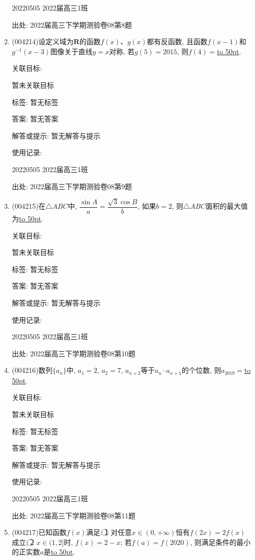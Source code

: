 \documentclass[10pt,a4paper]{article}
\newcommand{\blank}[1]{\underline{\hbox to #1pt{}}}
\begin{document}
\begin{enumerate}[1.]
20220505	2022届高三1班	


出处: 2022届高三下学期测验卷08第8题
\item { (004214)}设定义域为$\mathbf{R}$的函数$f(x)$、$g(x)$都有反函数, 且函数$f(x-1)$和$g^{-1}(x-3)$图像关于直线$y=x$对称, 若$g(5)=2015$, 则$f(4)=$\blank{50}.


关联目标:

暂未关联目标



标签: 暂无标签

答案: 暂无答案

解答或提示: 暂无解答与提示

使用记录:

20220505	2022届高三1班	


出处: 2022届高三下学期测验卷08第9题
\item { (004215)}在$\triangle ABC$中, $\dfrac{\sin A}a=\dfrac{\sqrt 3\cos B}b$, 如果$b=2$, 则$\triangle ABC$面积的最大值为\blank{50}.


关联目标:

暂未关联目标



标签: 暂无标签

答案: 暂无答案

解答或提示: 暂无解答与提示

使用记录:

20220505	2022届高三1班	


出处: 2022届高三下学期测验卷08第10题
\item { (004216)}数列$\{a_n\}$中, $a_1=2$, $a_2=7$, $a_{n+2}$等于$a_n\cdot a_{n+1}$的个位数, 则$a_{2019}=$\blank{50}.


关联目标:

暂未关联目标



标签: 暂无标签

答案: 暂无答案

解答或提示: 暂无解答与提示

使用记录:

20220505	2022届高三1班	


出处: 2022届高三下学期测验卷08第11题
\item { (004217)}已知函数$f(x)$满足: \textcircled{1} 对任意$x\in (0,+\infty)$恒有$f(2x)=2f(x)$成立; \textcircled{2} $x\in (1,2]$时, $f(x)=2-x$; 若$f(a)=f(2020)$, 则满足条件的最小的正实数$a$是\blank{50}.



\end{enumerate}
\end{document}
